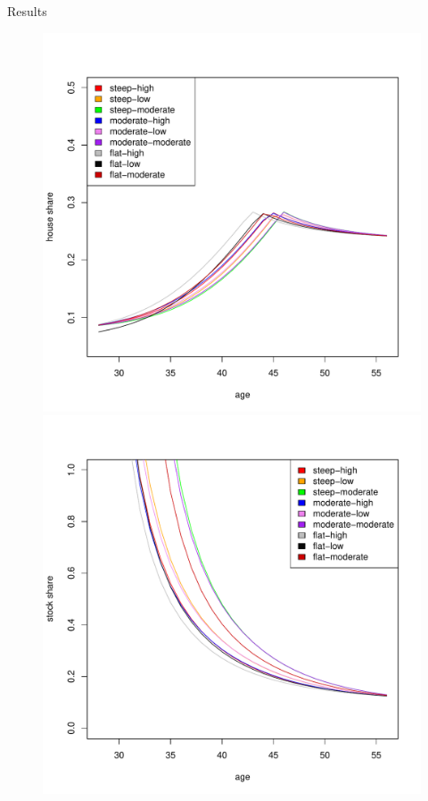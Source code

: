 \documentclass{beamer}
\begin{document}
\begin{frame}[allowframebreaks]{Results}
\begin{itemize}
\begin{figure}[H]
		\includegraphics[scale=0.25]{figs/hmunkhouse5.pdf}
		\includegraphics[scale=0.25]{figs/smunkhouse10.pdf}

\end{figure}
\end{itemize}
\end{frame}
\end{document}

